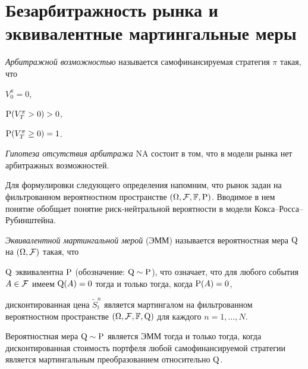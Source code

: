 \section{Безарбитражность рынка и эквивалентные мартингальные меры}

\begin{definition}
\emph{Арбитражной возможностью} называется самофинансируемая стратегия $\pi$ такая, что 
\begin{alphenum}
\item $V_0^\pi = 0$,
\item $\P(V_T^\pi > 0) > 0$,
\item $\P(V_T^\pi \ge 0)=1$.
\end{alphenum}
\emph{Гипотеза отсутствия арбитража} NA состоит в том, что в модели рынка нет арбитражных возможностей.
\end{definition}

Для формулировки следующего определения напомним, что рынок задан на фильтрованном вероятностном пространстве $(\Omega,\F,\FF,\P)$.
Вводимое в нем понятие обобщает понятие риск-нейтральной вероятности в модели Кокса--Росса--Рубинштейна.

\begin{definition}
\emph{Эквивалентной мартингальной мерой} (ЭММ) называется вероятностная мера $\Q$ на $(\Omega,\F)$ такая, что 
\begin{alphenum}
\item $\Q$ эквивалентна $\P$ (обозначение: $\Q\sim\P$), что означает, что для любого события $A\in\F$ имеем $\Q(A)=0$ тогда и только тогда, когда $\P(A)=0$,

\item дисконтированная цена $\tilde S_t^n$ является мартингалом на фильтрованном вероятностном пространстве $(\Omega,\F,\FF,\Q)$ для каждого $n=1,\dots,N$.
\end{alphenum}
\end{definition}

\begin{proposition}
\label{gen:p:discount-value}
Вероятностная мера $\Q\sim\P$ является ЭММ тогда и только тогда, когда дисконтированная стоимость портфеля любой самофинансируемой стратегии является мартингальным преобразованием относительно $\Q$.
\end{proposition}

